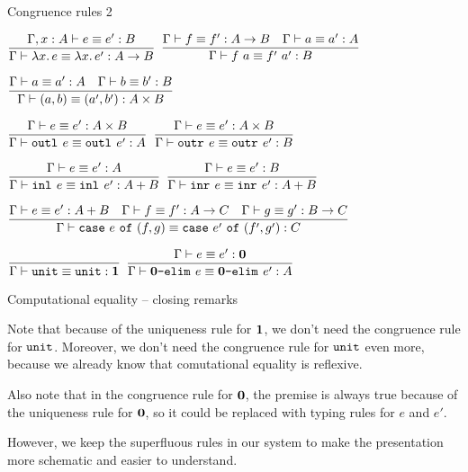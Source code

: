 \documentclass{beamer}
\begin{document}
\begin{frame}{Congruence rules 2}

\begin{center}
  $\infrule{\compeq[\extend{\Gamma}{x}{A}]{e}{e'}{B}}{\compeq{\fun{x}{e}}{\fun{x}{e'}}{\Fun{A}{B}}}$ \quad
  $\infrule{\compeq{f}{f'}{\Fun{A}{B}} \quad \compeq{a}{a'}{A}}{\compeq{\app{f}{a}}{\app{f'}{a'}}{B}}$

  \vspace{1em}

  $\infrule{\compeq{a}{a'}{A} \quad \compeq{b}{b'}{B}}{\compeq{\pair{a}{b}}{\pair{a'}{b'}}{\Prod{A}{B}}}$

  \vspace{1em}

  $\infrule{\compeq{e}{e'}{\Prod{A}{B}}}{\compeq{\outl{e}}{\outl{e'}}{A}}$ \quad
  $\infrule{\compeq{e}{e'}{\Prod{A}{B}}}{\compeq{\outr{e}}{\outr{e'}}{B}}$

  \vspace{1em}

  $\infrule{\compeq{e}{e'}{A}}{\compeq{\inl{e}}{\inl{e'}}{\Sum{A}{B}}}$ \quad
  $\infrule{\compeq{e}{e'}{B}}{\compeq{\inr{e}}{\inr{e'}}{\Sum{A}{B}}}$

  \vspace{1em}

  $\infrule{\compeq{e}{e'}{\Sum{A}{B}} \quad \compeq{f}{f'}{\Fun{A}{C}} \quad \compeq{g}{g'}{\Fun{B}{C}}}{\compeq{\case{e}{f}{g}}{\case{e'}{f'}{g'}}{C}}$

  \vspace{1em}

  $\infrule{}{\compeq{\unit}{\unit}{\Unit}}$ \quad
  $\infrule{\compeq{e}{e'}{\Empty}}{\compeq{\emptyelim{e}}{\emptyelim{e'}}{A}}$
\end{center}

\end{frame}

\begin{frame}{Computational equality -- closing remarks}

Note that because of the uniqueness rule for $\textbf{1}$, we don't need the congruence rule for $\texttt{unit}$. Moreover, we don't need the congruence rule for $\texttt{unit}$ even more, because we already know that comutational equality is reflexive.

\vspace{1em}

Also note that in the congruence rule for $\textbf{0}$, the premise is always true because of the uniqueness rule for $\textbf{0}$, so it could be replaced with typing rules for $e$ and $e'$.

\vspace{1em}

However, we keep the superfluous rules in our system to make the presentation more schematic and easier to understand.

\end{frame}
\end{document}
